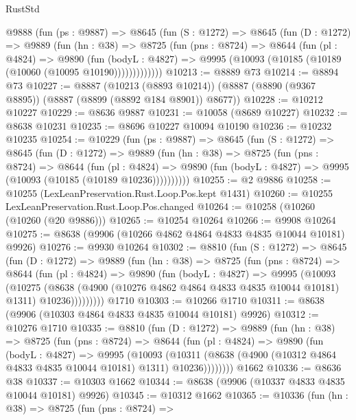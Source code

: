 \begin{lexlean}{RustStd}
\begin{coremodule}
    @9888
      (fun (ps : @9887) =>
      @8645
        (fun (S : @1272) =>
        @8645
          (fun (D : @1272) =>
          @9889
            (fun (hn : @38) =>
            @8725
              (fun (pns : @8724) =>
              @8644
                (fun (pl : @4824) =>
                @9890
                  (fun (bodyL : @4827) =>
                  @9995 (@10093 (@10185 (@10189 (@10060 (@10095 @10190)))))))))))))
@10213 := @8889 @73
@10214 := @8894 @73
@10227 := @8887
    (@10213 (@8893 @10214))
    (@8887 (@8890 (@9367 @8895)) (@8887 (@8899 (@8892 @184 @8901)) @8677))
@10228 := @10212 @10227
@10229 := @8636 @9887
@10231 := @10058 (@8689 @10227)
@10232 := @8638 @10231
@10235 := @8696 @10227 @10094 @10190
@10236 := @10232 @10235
@10254 := @10229
    (fun (ps : @9887) =>
    @8645
      (fun (S : @1272) =>
      @8645
        (fun (D : @1272) =>
        @9889
          (fun (hn : @38) =>
          @8725
            (fun (pns : @8724) =>
            @8644
              (fun (pl : @4824) =>
              @9890 (fun (bodyL : @4827) => @9995 (@10093 (@10185 (@10189 @10236))))))))))
@10255 := @2 @9886
@10258 := @10255 (LexLeanPreservation.Rust.Loop.Pos.kept @1431)
@10260 := @10255 LexLeanPreservation.Rust.Loop.Pos.changed
@10264 := @10258 (@10260 (@10260 (@20 @9886)))
@10265 := @10254 @10264
@10266 := @9908 @10264
@10275 := @8638 (@9906 (@10266 @4862 @4864 @4833 @4835 @10044 @10181) @9926)
@10276 := @9930 @10264
@10302 := @8810
    (fun (S : @1272) =>
    @8645
      (fun (D : @1272) =>
      @9889
        (fun (hn : @38) =>
        @8725
          (fun (pns : @8724) =>
          @8644
            (fun (pl : @4824) =>
            @9890
              (fun (bodyL : @4827) =>
              @9995
                (@10093
                  (@10275
                    (@8638
                      (@4900 (@10276 @4862 @4864 @4833 @4835 @10044 @10181) @1311)
                      @10236)))))))))
    @1710
@10303 := @10266 @1710
@10311 := @8638 (@9906 (@10303 @4864 @4833 @4835 @10044 @10181) @9926)
@10312 := @10276 @1710
@10335 := @8810
    (fun (D : @1272) =>
    @9889
      (fun (hn : @38) =>
      @8725
        (fun (pns : @8724) =>
        @8644
          (fun (pl : @4824) =>
          @9890
            (fun (bodyL : @4827) =>
            @9995
              (@10093
                (@10311 (@8638 (@4900 (@10312 @4864 @4833 @4835 @10044 @10181) @1311) @10236))))))))
    @1662
@10336 := @8636 @38
@10337 := @10303 @1662
@10344 := @8638 (@9906 (@10337 @4833 @4835 @10044 @10181) @9926)
@10345 := @10312 @1662
@10365 := @10336
    (fun (hn : @38) =>
    @8725
      (fun (pns : @8724) =>

\end{coremodule}
\end{lexlean}
